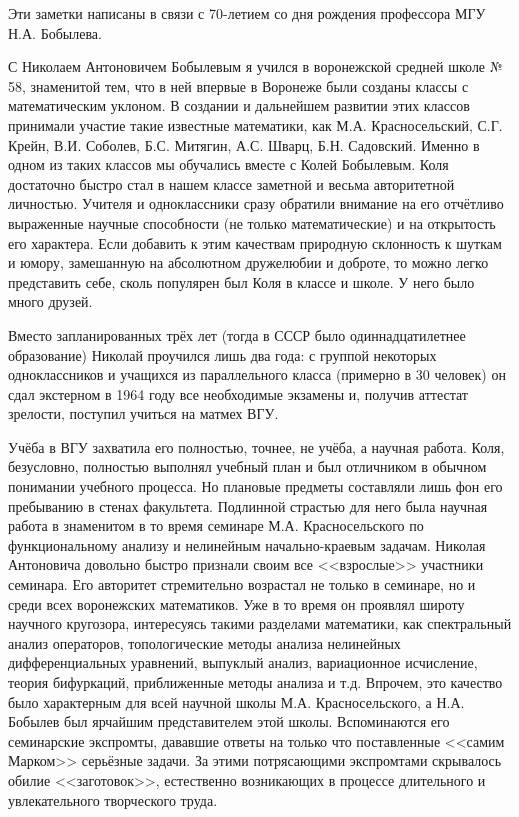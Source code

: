 
\vzmscaption

Эти заметки написаны в связи с 70-летием со дня рождения профессора
МГУ Н.А. Бобылева.

 С Николаем Антоновичем Бобылевым я учился в воронежской средней
школе № 58, знаменитой тем, что в ней впервые в Воронеже были
созданы классы с математическим уклоном. В создании и дальнейшем
развитии этих
\linebreak
классов принимали участие такие известные математики,
как М.А. Красносельский, С.Г. Крейн, В.И. Соболев, Б.С. Митя\-гин,
А.С. Шварц, Б.Н. Садовский. Именно в одном из таких классов мы
обучались вместе с Колей Бобылевым. Коля достаточно быстро стал в
нашем классе заметной и весьма авторитетной личностью. Учителя и
одноклассники сразу обратили внимание на его отчётливо выраженные
научные способности (не только математические) и на открытость его
характера. Если добавить к этим качествам природную склонность к
шуткам и юмору, замешанную на абсолютном дружелюбии и доброте, то
можно легко представить себе, сколь популярен был Коля в классе и
школе. У него было много друзей.

Вместо запланированных трёх лет (тогда в СССР было одиннадцатилетнее
образование) Николай проучился лишь два года: с группой некоторых
одноклассников и учащихся из параллельного класса (примерно в 30
человек) он сдал экстерном в 1964 году все необходимые экзамены и,
получив аттестат зрелости, поступил учиться на матмех ВГУ.

Учёба в ВГУ захватила его полностью, точнее, не учёба, а научная
работа. Коля, безусловно, полностью выполнял учебный план и был
отличником в обычном понимании учебного процесса. Но плановые
предметы составляли лишь фон его пребыванию в стенах факультета.
Подлинной страстью для него была научная работа в знаменитом в то
время семинаре М.А. Красносельского по функциональному анализу и
нелинейным на\-чаль\-но-крае\-вым задачам. Николая Антоновича
довольно быстро признали своим все <<взрослые>> участники семинара.
Его авторитет стремительно возрастал не только в семинаре, но и
среди всех воронежских математиков. Уже в то время он проявлял
широту научного кругозора, интересуясь такими разделами математики,
как спектральный анализ операторов, топологические методы анализа
нелинейных дифференциальных уравнений, выпуклый анализ, вариационное
исчисление, теория бифуркаций, приближенные методы анализа и т.д.
Впрочем, это качество было характерным для всей научной школы М.А.
Красносельского, а Н.А. Бобылев был ярчайшим представителем этой
школы. Вспоминаются его семинарские экспромты, дававшие ответы на
только что поставленные <<самим Марком>> серьёзные задачи. За этими
потрясающими экспромтами скрывалось обилие <<заготовок>>,
естественно возникающих в процессе длительного и увлекательного
творческого труда.

